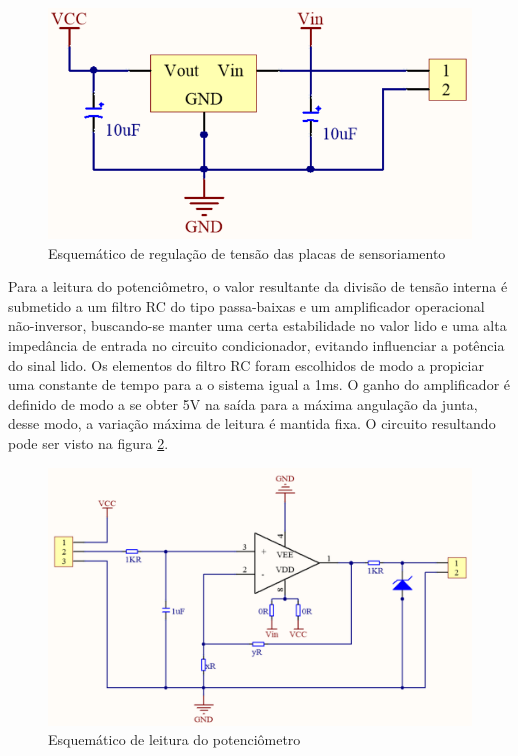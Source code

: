 \begin{figure}[h]
    \caption{Esquemático de regulação de tensão das placas de sensoriamento}    
    \begin{centering}

        \includegraphics[width=0.5\columnwidth]{images/pcbs/SensorPCB-Regulator.png}
    
    \par\end{centering}

    \label{fig:Esquematico-regulador}
\end{figure}

Para a leitura do potenciômetro, o valor resultante da divisão de tensão 
interna é submetido a um filtro RC do tipo passa-baixas e um amplificador 
operacional não-inversor, buscando-se manter uma certa estabilidade no valor lido e uma alta
impedância de entrada no circuito condicionador, evitando influenciar a 
potência do sinal lido. Os elementos do filtro RC foram escolhidos de modo a propiciar uma 
constante de tempo para a o sistema igual a 1ms.
O ganho do amplificador é definido de modo a se obter 5V na saída para a máxima 
angulação da junta, desse modo, a variação máxima de leitura é mantida fixa.
O circuito resultando pode ser visto na figura \ref{fig:Esquematico-sensor-pot}. 

\begin{figure}[ht]
    \caption{Esquemático de leitura do potenciômetro}    
    \begin{centering}

        \includegraphics[width=0.75\columnwidth]{images/pcbs/SensorPCB-Pot.png}
    
    \par\end{centering}

    \label{fig:Esquematico-sensor-pot}
\end{figure}

